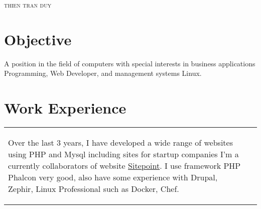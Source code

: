 \documentclass[a4paper, oneside, final]{scrartcl} %
\newcommand{\gray}{\rowcolor[gray]{.90}} %
\begin{document}
\begin{center} %


{\fontsize{35}{35}\selectfont\scshape thien tran duy} %

\vspace{1.5cm} %


\section{Objective}

A position in the field of computers with special interests in business applications \\ Programming, Web Developer, and management systems Linux.


\section{Work Experience}

\begin{tabularx}{0.97\linewidth}{>{\raggedleft}p{13.8cm}X}
\gray 
 \begin{flushleft}
Over the last 3 years, I have developed a wide range of websites using PHP and Mysql including sites for startup companies I'm a currently collaborators of website  \href{http://sitepoint.co}{Sitepoint}. I use framework PHP Phalcon very good, also have some experience with Drupal, Zephir, Linux Professional such as Docker, Chef.
\end{flushleft}
\end{tabularx}



\end{center}
\end{document}
